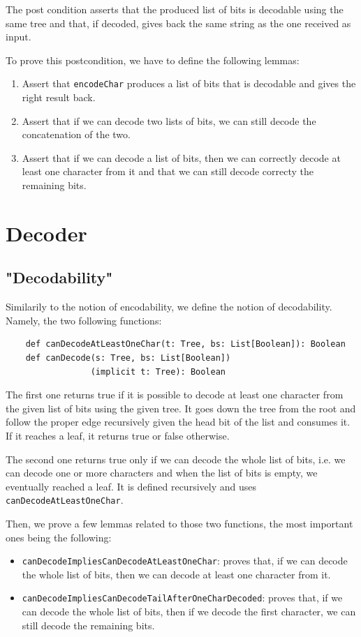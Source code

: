 \documentclass[a4paper,UKenglish,cleveref, autoref, thm-restate]{lipics-v2021}
\begin{document}
The post condition asserts that the produced list of bits is decodable using the same tree and that, if decoded, gives back the same string as the one received as input.

To prove this postcondition, we have to define the following lemmas:
\begin{enumerate}
    \item Assert that \lstinline{encodeChar} produces a list of bits that is decodable and gives the right result back.
    \item Assert that if we can decode two lists of bits, we can still decode the concatenation of the two.
    \item Assert that if we can decode a list of bits, then we can correctly decode at least one character from it and that we can still decode correcty the remaining bits.
\end{enumerate}

\section{Decoder}

\subsection{"Decodability"}
Similarily to the notion of encodability, we define the notion of decodability. Namely, the two following functions:

\begin{lstlisting}
    def canDecodeAtLeastOneChar(t: Tree, bs: List[Boolean]): Boolean
    def canDecode(s: Tree, bs: List[Boolean])
                 (implicit t: Tree): Boolean
\end{lstlisting}

The first one returns true if it is possible to decode at least one character from the given list of bits using the given tree. 
It goes down the tree from the root and follow the proper edge recursively given the head bit of the list and consumes it. If it reaches a leaf, it returns true or false otherwise.

The second one returns true only if we can decode the whole list of bits, i.e. we can decode one or more characters and when the list of bits is empty, we eventually reached a leaf. It is defined recursively and uses \lstinline{canDecodeAtLeastOneChar}.

Then, we prove a few lemmas related to those two functions, the most important ones being the following:
\begin{itemize}
    \item \lstinline{canDecodeImpliesCanDecodeAtLeastOneChar}: proves that, if we can decode the whole list of bits, then we can decode at least one character from it.
    \item \lstinline{canDecodeImpliesCanDecodeTailAfterOneCharDecoded}: proves that, if we can decode the whole list of bits, then if we decode the first character, we can still decode the remaining bits.
\end{itemize}
\end{document}
